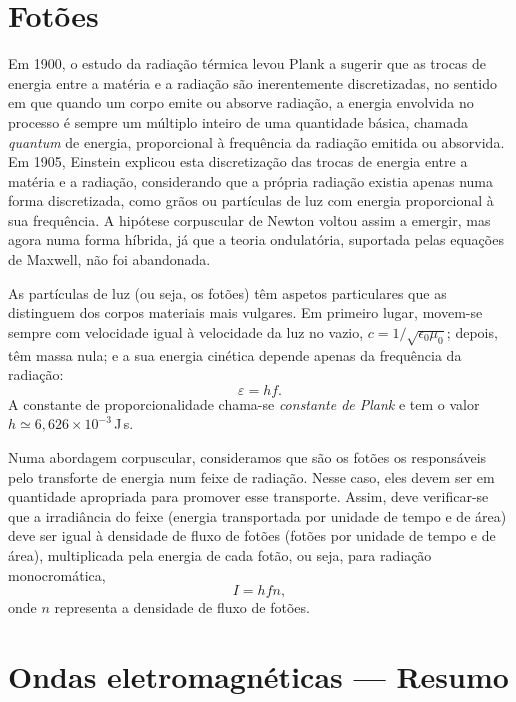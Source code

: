 \section{Fotões}
Em 1900, o estudo da radiação térmica levou Plank a sugerir que as trocas de
energia entre a matéria e a radiação são inerentemente discretizadas, no sentido
em que quando um corpo emite ou absorve radiação, a energia envolvida no
processo é sempre um múltiplo inteiro de uma quantidade básica, chamada
\emph{quantum} de energia, proporcional à frequência da radiação emitida ou
absorvida. Em 1905, Einstein explicou esta discretização das trocas de energia
entre a matéria e a radiação, considerando que a própria radiação existia
apenas numa forma discretizada, como grãos ou partículas de luz com energia
proporcional à sua frequência. A hipótese corpuscular de Newton voltou assim a
emergir, mas agora numa forma híbrida, já que a teoria ondulatória, suportada
pelas equações de Maxwell, não foi abandonada.

As partículas de luz (ou seja, os fotões) têm aspetos particulares que as
distinguem dos corpos materiais mais vulgares. Em primeiro lugar, movem-se
sempre com velocidade igual à velocidade da luz no vazio,
$c=1/\sqrt{\epsilon_0\mu_0}$; depois, têm massa nula; e a sua energia cinética
depende apenas da frequência da radiação:
\begin{equation*}
    \varepsilon=hf.
\end{equation*}
A constante de proporcionalidade chama-se \emph{constante de Plank} e tem o
valor $h\simeq6,626\times10^{-3}$\,J\,s.

Numa abordagem corpuscular, consideramos que são os fotões os responsáveis pelo
transforte de energia num feixe de radiação. Nesse caso, eles devem ser em
quantidade apropriada para promover esse transporte. Assim, deve verificar-se
que a irradiância do feixe (energia transportada por unidade de tempo e de área)
deve ser igual à densidade de fluxo de fotões (fotões por unidade de tempo e de
área), multiplicada pela energia de cada fotão, ou seja, para radiação
monocromática,
\begin{equation}
    I=hfn,
\end{equation}
onde $n$ representa a densidade de fluxo de fotões.


\section*{Ondas eletromagnéticas --- Resumo}

